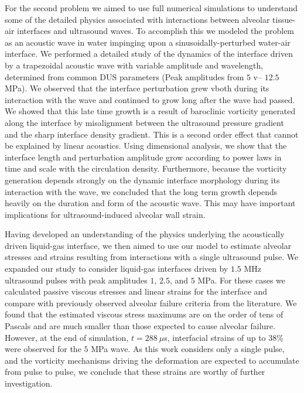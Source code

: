 For the second problem we aimed to use full numerical simulations to
understand some of the detailed physics associated with interactions
between alveolar tissue-air interfaces and ultrasound waves. To
accomplish this we modeled the problem as an acoustic wave in water
impinging upon a sinusoidally-perturbed water-air interface. We
performed a detailed study of the dynamics of the interface driven by
a trapezoidal acoustic wave with variable amplitude and wavelength,
determined from common \ac{DUS} parameters (Peak amplitudes from $5$
v-- $12.5$ MPa). We observed that the interface perturbation grew
vboth during its interaction with the wave and continued to grow long
after the wave had passed. We showed that this late time growth is a
result of baroclinic vorticity generated along the interface by
misalignment between the ultrasound pressure gradient and the sharp
interface density gradient. This is a second order effect that cannot
be explained by linear acoustics. Using dimensional analysis, we show
that the interface length and perturbation amplitude grow according to
power laws in time and scale with the circulation
density. Furthermore, because the vorticity generation depends
strongly on the dynamic interface morphology during its interaction
with the wave, we concluded that the long term growth depends heavily
on the duration and form of the acoustic wave. This may have important
implications for ultrasound-induced alveolar wall strain.

Having developed an understanding of the physics underlying the
acoustically driven liquid-gas interface, we then aimed to use our
model to estimate alveolar stresses and strains resulting from
interactions with a single ultrasound pulse. We expanded our study to
consider liquid-gas interfaces driven by $1.5$ MHz ultrasound pulses
with peak amplitudes $1$, $2.5$, and $5$ MPa. For these cases we
calculated passive viscous stresses and linear strains for the
interface and compare with previously observed alveolar failure
criteria from the literature. We found that the estimated viscous
stress maximums are on the order of tens of Pascals and are much
smaller than those expected to cause alveolar failure. However, at the
end of simulation, $t=288~\mu$s, interfacial strains of up to 38\% were
observed for the $5$ MPa wave. As this work considers only a single pulse,
and the vorticity mechanisms driving the deformation are expected to accumulate
from pulse to pulse, we conclude that these strains are worthy of
further investigation.

